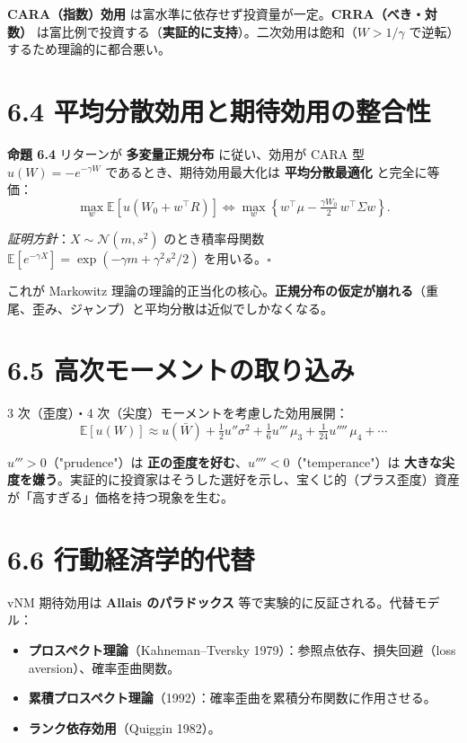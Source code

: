 \documentclass[11pt,a4paper]{report}
\begin{document}
\textbf{CARA（指数）効用} は富水準に依存せず投資量が一定。\textbf{CRRA（べき・対数）} は富比例で投資する（\textbf{実証的に支持}）。二次効用は飽和（$W > 1/\gamma$ で逆転）するため理論的に都合悪い。

\section{6.4 平均分散効用と期待効用の整合性}

\textbf{命題 6.4} リターンが \textbf{多変量正規分布} に従い、効用が CARA 型 $u(W) = -e^{-\gamma W}$ であるとき、期待効用最大化は \textbf{平均分散最適化} と完全に等価： \[ \max_w \mathbb{E}[u(W_0 + w^\top R)] \iff \max_w \left\{ w^\top \mu - \tfrac{\gamma W_0}{2}\, w^\top \Sigma w\right\}. \]

\emph{証明方針}：$X \sim \mathcal{N}(m, s^2)$ のとき積率母関数 $\mathbb{E}[e^{-\gamma X}] = \exp(-\gamma m + \gamma^2 s^2/2)$ を用いる。$\square$

これが Markowitz 理論の理論的正当化の核心。\textbf{正規分布の仮定が崩れる}（重尾、歪み、ジャンプ）と平均分散は近似でしかなくなる。

\section{6.5 高次モーメントの取り込み}

3 次（歪度）・4 次（尖度）モーメントを考慮した効用展開： \[ \mathbb{E}[u(W)] \approx u(\bar W) + \tfrac{1}{2} u''\sigma^2 + \tfrac{1}{6} u'''\, \mu_3 + \tfrac{1}{24} u''''\, \mu_4 + \cdots \]

$u''' > 0$（"prudence"）は \textbf{正の歪度を好む}、$u'''' < 0$（"temperance"）は \textbf{大きな尖度を嫌う}。実証的に投資家はそうした選好を示し、宝くじ的（プラス歪度）資産が「高すぎる」価格を持つ現象を生む。

\section{6.6 行動経済学的代替}

vNM 期待効用は \textbf{Allais のパラドックス} 等で実験的に反証される。代替モデル：

\begin{itemize}
\item \textbf{プロスペクト理論}（Kahneman–Tversky 1979）：参照点依存、損失回避（loss aversion）、確率歪曲関数。
\item \textbf{累積プロスペクト理論}（1992）：確率歪曲を累積分布関数に作用させる。
\item \textbf{ランク依存効用}（Quiggin 1982）。
\end{itemize}
\end{document}
